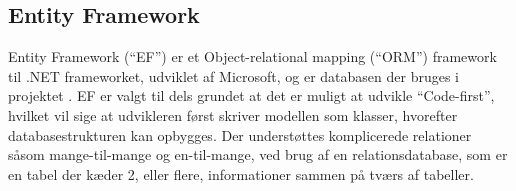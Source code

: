 \subsection{Entity Framework}
Entity Framework (``EF'') er et Object-relational mapping (``ORM'') framework til .NET frameworket, udviklet af Microsoft, og er databasen der bruges i projektet \citep{EF}.
EF er valgt til dels grundet at det er muligt at udvikle ``Code-first'', hvilket vil sige at udvikleren først skriver modellen som klasser, hvorefter databasestrukturen kan opbygges.
Der understøttes komplicerede relationer såsom mange-til-mange og en-til-mange, ved brug af en relationsdatabase, som er en tabel der kæder 2, eller flere, informationer sammen på tværs af tabeller.
